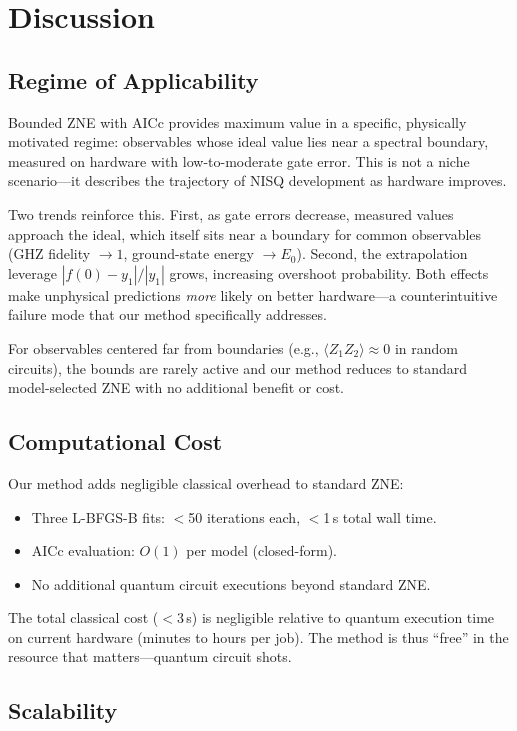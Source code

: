 \section{Discussion}
\label{sec:discussion}

\subsection{Regime of Applicability}

Bounded ZNE with AICc provides maximum value in a specific, physically motivated regime: observables whose ideal value lies near a spectral boundary, measured on hardware with low-to-moderate gate error. This is not a niche scenario---it describes the trajectory of NISQ development as hardware improves.

Two trends reinforce this. First, as gate errors decrease, measured values approach the ideal, which itself sits near a boundary for common observables (GHZ fidelity $\to 1$, ground-state energy $\to E_0$). Second, the extrapolation leverage $|f(0) - y_1|/|y_1|$ grows, increasing overshoot probability. Both effects make unphysical predictions \emph{more} likely on better hardware---a counterintuitive failure mode that our method specifically addresses.

For observables centered far from boundaries (e.g., $\langle Z_1 Z_2 \rangle \approx 0$ in random circuits), the bounds are rarely active and our method reduces to standard model-selected ZNE with no additional benefit or cost.

\subsection{Computational Cost}

Our method adds negligible classical overhead to standard ZNE:
\begin{itemize}
    \item Three L-BFGS-B fits: $<$50 iterations each, $<$1\,s total wall time.
    \item AICc evaluation: $O(1)$ per model (closed-form).
    \item No additional quantum circuit executions beyond standard ZNE.
\end{itemize}
The total classical cost ($<$3\,s) is negligible relative to quantum execution time on current hardware (minutes to hours per job). The method is thus ``free'' in the resource that matters---quantum circuit shots.

\subsection{Scalability}

